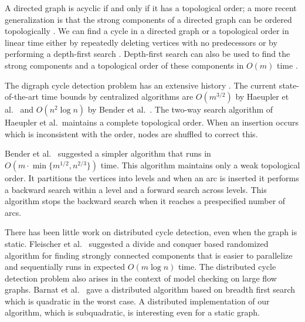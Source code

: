 \documentclass[11pt]{article}
\theoremstyle{plain}
\theoremstyle{definition}
\theoremstyle{remark}
\numberwithin{equation}{section}
\begin{document}
\smallskip
{}

A directed graph is acyclic if and only if it has a topological
order; a more recent generalization is that the strong components of
a directed graph can be ordered topologically
\cite{harary1965structural}. We can find a cycle in a directed graph
or a topological order in linear time either by repeatedly deleting
 vertices with no
predecessors \cite{KnuthS74} or by performing a depth-first search
\cite{Tarjan72dfs}. Depth-first search can also be used to find the
strong components and a topological order of these components in
$O(m)$ time \cite{Tarjan72dfs}.





  The
  digraph cycle detection problem has an extensive history
  \cite{AlpernHRSZ90,Marchetti-SpaccamelaNR96,PearceK06,KatrielB06,LiuC07,AjwaniFM08,AjwaniF10,DBLP:journals/corr/abs-0711-0251,HKMST:Talg12,BFG:SODA09}.
    The current state-of-the-art
time bounds by centralized algorithms are  $O(m^{3/2})$ by Haeupler
 et al.\ \cite{HKMST:Talg12}
 and $O(n^2\log n)$ by Bender  et al.\ \cite{BFG:SODA09}.
  The two-way search  algorithm of  Haeupler
 et al.\ maintains a complete topological order.
    When
an insertion occurs which is inconsistent with the order,  nodes are
shuffled to correct this.


 Bender et
al.\ \cite{BFG:SODA09} suggested a simpler algorithm that runs in
 $O(m \cdot \min \{ m^{1/2}, n^{2/3} \})$ time. This algorithm maintains only a
 weak topological order. It partitions
 the vertices  into levels and when an arc is inserted it performs a
 backward search within a level and a forward search across levels.
 This algorithm stops the backward search when it reaches a
prespecified number of arcs.


There has been little work on distributed cycle detection, even when
the graph is static. Fleischer et al.\ \cite{FleischerHP00}
suggested a divide and conquer based randomized algorithm for
finding strongly connected components that is easier to parallelize
and sequentially runs in expected $O(m\log n)$ time. The distributed
cycle detection problem also arises in the context of model checking
on large flow graphs. Barnat et al.\ \cite{BarnatBC05} gave a
distributed algorithm based on breadth first search which is
quadratic in the worst case. A distributed implementation of our
algorithm, which is subquadratic, is interesting even for a static
graph.


\smallskip
{}
\end{document}
